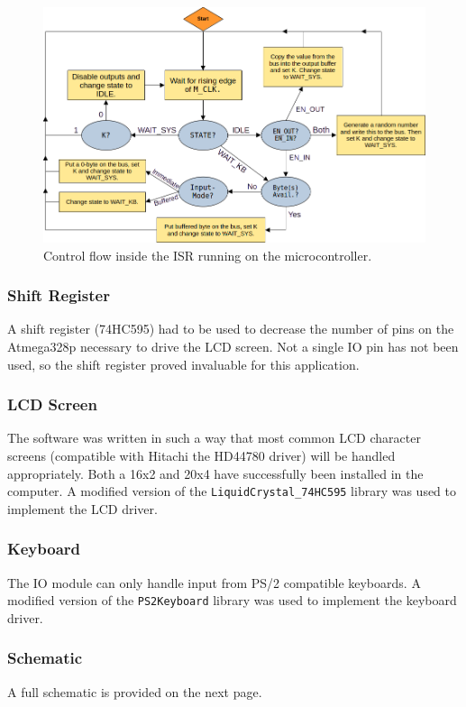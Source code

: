 \begin{figure}[H]
  \centering
  \includegraphics[width=\textwidth]{img/isrflow}
  \caption{Control flow inside the ISR running on the microcontroller.}
  \label{fig:isrflow}
\end{figure}

\subsubsection{Shift Register}
A shift register (74HC595) had to be used to decrease the number of pins on the Atmega328p necessary to drive the LCD screen. Not a single IO pin has not been used, so the shift register proved invaluable for this application.

\subsubsection{LCD Screen}
The software was written in such a way that most common LCD character screens (compatible with Hitachi the HD44780 driver) will be handled appropriately. Both a 16x2 and 20x4 have successfully been installed in the computer. A modified version of the \texttt{LiquidCrystal\_74HC595} library was used to implement the LCD driver.

\subsubsection{Keyboard}
The IO module can only handle input from PS/2 compatible keyboards. A modified version of the \texttt{PS2Keyboard} library was used to implement the keyboard driver.


\subsubsection{Schematic}
A full schematic is provided on the next page.



